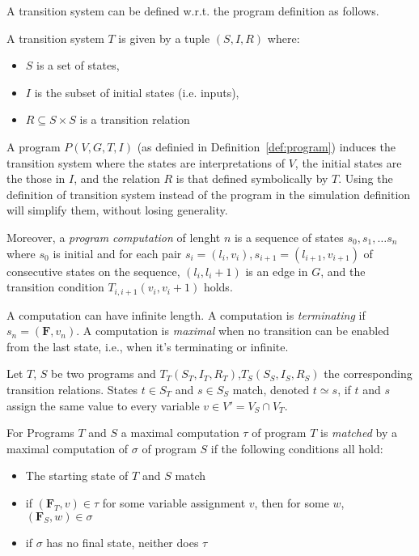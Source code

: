 A transition system can be defined w.r.t. the program definition as follows.

\begin{fdefinition}
A transition system $T$ is given by a tuple $(S,I,R)$ where:

\begin{itemize}
  \item $S$ is a set of states,
  \item $I$ is the subset of initial states (i.e. inputs),
  \item $R \subseteq S \times S$ is a transition relation
\end{itemize}
\end{fdefinition}

A program $P(V, G, T, I)$ (as definied in Definition~\ref{def:program}) induces the transition system where the states are interpretations of $V$, the initial states are the those in $I$, and the relation $R$ is that defined symbolically by $T$. Using the definition of transition system instead of the program in the simulation definition will simplify them, without losing generality.

Moreover, a \emph{program computation} of lenght $n$ is a sequence of states $s_0, s_1 ,\ldots s_n$ where $s_0$ is initial and for each pair $s_i=(l_i,v_i), s_{i+1}=(l_{i+1},v_{i+1})$ of consecutive states on the sequence, $(l_i, l_i+1)$ is an edge in $G$, and the transition condition $T_{i,i+1}(v_i,v_i+1)$ holds.

A computation can have infinite length. A computation is \emph{terminating} if $s_n = (\textbf{F},v_n)$. A computation is \emph{maximal} when no transition can be enabled from the last state, i.e., when it's terminating or infinite.

\begin{fdefinition}
Let $T$, $S$ be two programs and $T_T(S_T,I_T,R_T)$,$T_S(S_S,I_S,R_S)$ the corresponding transition relations. States $t \in S_T$ and $s \in S_S$ match, denoted $t \simeq s$, if $t$ and $s$ assign the same value to every variable $v \in V' = V_S \cap V_T$.
\end{fdefinition}

\begin{fdefinition}
\label{def:path_matching}
For Programs $T$ and $S$ a maximal computation $\tau$ of program $T$ is \emph{matched} by a maximal computation of $\sigma$ of program $S$ if the following conditions all hold:
\begin{itemize}
  \item The starting state of $T$ and $S$ match
  \item if $(\textbf{F}_T,v) \in \tau$ for some variable assignment $v$, then for some $w$, $(\textbf{F}_S,w) \in \sigma$
  \item if $\sigma$ has no final state, neither does $\tau$
\end{itemize}


\end{fdefinition}

